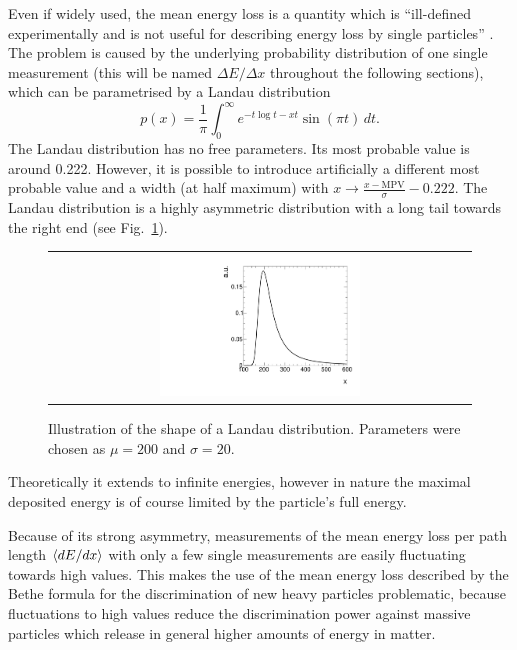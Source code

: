 Even if widely used, the mean energy loss is a quantity which is ``ill-defined experimentally and is not useful for describing energy loss by single particles'' \cite{bib:PDG_2014}.
The problem is caused by the underlying probability distribution of one single \dedx measurement (this will be named $\Delta E/ \Delta x $ throughout the following sections), which can be parametrised by a Landau distribution \cite{bib:Landau_1944}
\begin{equation}
p(x) = \frac{1}{\pi} \int_0^\infty\! e^{-t \log t - x t} \sin(\pi t)\, dt.
\end{equation}
The Landau distribution has no free parameters. Its most probable value is around 0.222.
However, it is possible to introduce artificially a different most probable value and a width (at half maximum) with $x \rightarrow \frac{x-\text{MPV}}{\sigma}-0.222$.
The Landau distribution is a highly asymmetric distribution with a long tail towards the right end (see Fig.~\ref{fig:landau}).
\begin{figure}[!b]
  \centering 
  \begin{tabular}{c}
  \includegraphics[width=0.49\textwidth]{figures/analysis/PixelCalibration/Landau.pdf}
  \end{tabular}
  \caption{Illustration of the shape of a Landau distribution. Parameters were chosen as $\mu=200$ and $\sigma=20$.} 
  \label{fig:landau}
\end{figure}
Theoretically it extends to infinite energies, however in nature the maximal deposited energy is of course limited by the particle's full energy.

Because of its strong asymmetry, measurements of the mean energy loss per path length $\langle dE/dx \rangle$ with only a few single measurements are easily fluctuating towards high values.
This makes the use of the mean energy loss described by the Bethe formula for the discrimination of new heavy particles problematic, because fluctuations to high values reduce the discrimination power against massive particles which release in general higher amounts of energy in matter.


